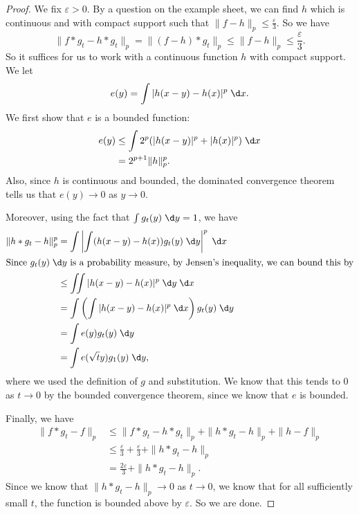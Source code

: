 \documentclass[a4paper]{article}
\begin{document}
\begin{proof}
  We fix $\varepsilon > 0$. By a question on the example sheet, we can find $h$ which is continuous and with compact support such that $\|f - h\|_p \leq \frac{\varepsilon}{3}$. So we have
  \[
    \|f * g_t - h * g_t\|_p = \|(f - h) * g_t\|_p \leq \|f - h\|_p \leq \frac{\varepsilon}{3}.
  \]
  So it suffices for us to work with a continuous function $h$ with compact support. We let
  \[
    e(y) = \int |h(x - y) - h(x)|^p \;\d x.
  \]
  We first show that $e$ is a bounded function:
  \begin{align*}
    e(y) &\leq \int 2^p(|h(x - y)|^p + |h(x)|^p)\;\d x\\
    &= 2^{p + 1} \|h\|_p^p.
  \end{align*}
  Also, since $h$ is continuous and bounded, the dominated convergence theorem tells us that $e(y) \to 0$ as $y \to 0$.

  Moreover, using the fact that $\int g_t(y) \;\d y = 1$, we have
  \begin{align*}
    \|h*g_t - h\|_p^p &= \int \left|\int (h(x - y) - h(x))g_t(y) \;\d y\right|^p \;\d x\\
    \intertext{Since $g_t(y) \;\d y$ is a probability measure, by Jensen's inequality, we can bound this by}
    &\leq \iint |h(x - y) - h(x)|^p \;\d y \;\d x\\
    &= \int \left(\int |h(x - y) - h(x)|^p \;\d x\right) g_t(y) \;\d y\\
    &= \int e(y) g_t(y) \;\d y\\
    &= \int e(\sqrt{t} y) g_1(y)\;\d y,
  \end{align*}
  where we used the definition of $g$ and substitution. We know that this tends to $0$ as $t \to 0$ by the bounded convergence theorem, since we know that $e$ is bounded.

  Finally, we have
  \begin{align*}
    \|f * g_t - f\|_p &\leq \|f * g_t - h * g_t\|_p + \|h*g_t - h\|_p + \|h - f\|_p\\
    &\leq \frac{\varepsilon}{3} + \frac{\varepsilon}{3} + \|h*g_t - h\|_p\\
    &= \frac{2\varepsilon}{3} + \|h*g_t - h\|_p.
  \end{align*}
  Since we know that $\|h*g_t - h\|_p \to 0$ as $t \to 0$, we know that for all sufficiently small $t$, the function is bounded above by $\varepsilon$. So we are done.
\end{proof}
\end{document}
